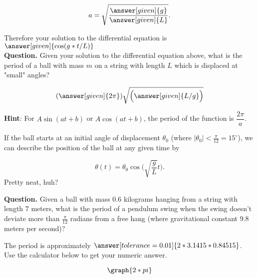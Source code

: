 \documentclass[handout,nooutcomes]{ximera}
\begin{document}
\begin{example}
\begin{explanation}
\[
a = \sqrt{\dfrac{\answer[given]{g}}{\answer[given]{L}}}.
\]

Therefore your solution to the differential equation is $\answer[given]{ \cos(g*t/L)}$\\



\textbf{Question. } Given your solution to the differential equation above, what is the period of a ball with mass $m$ on a string with length $L$ which is displaced at "small" angles?

\[
(\answer[given]{2\pi})\sqrt{\Big(\answer[given]{L/g}\Big)}
\]
\medskip

\textbf{Hint}: For $A\sin(at+b)$ or $A\cos(at+b)$, the period of the 
function is $\dfrac{2\pi}{a}$.


If the ball starts at an initial angle of displacement $\theta_0$
(where $|\theta_0|<\frac{\pi}{12}= 15^\circ$), we can describe
the position of the ball at any given time by

\[
\theta(t) = \theta_0 \cos\Big(\sqrt{\frac{g}{L}} t\Big).
\]
Pretty neat, huh?


\textbf{Question. } Given a ball with mass $0.6$ kilograms hanging from a string with length $7$ meters, what is the period of a pendulum swing when the swing doesn't deviate more than $\frac{\pi}{12}$ radians from a free hang (where gravitational constant $9.8$ meters per second)?


The period is approximately $\answer[tolerance=0.01]{2*3.1415*0.84515}$.\\

Use the calculator below to get your numeric answer.

\[
\graph{2*pi}
\]


\end{explanation}
\end{example}
\end{document}
